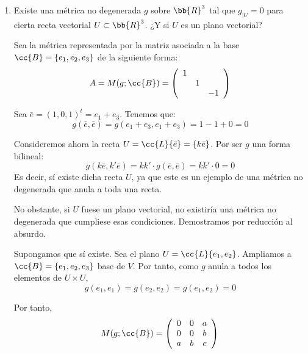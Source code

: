 \begin{ejercicio}
\begin{enumerate}
        \item Existe una métrica no degenerada $g$ sobre $\bb{R}^3$ tal que $g_{\left|U\right.}=0$ para cierta recta vectorial $U\subset \bb{R}^3$. ¿Y si $U$ es un plano vectorial?
        
        Sea la métrica representada por la matriz asociada a la base $\cc{B}=\{e_1,e_2,e_3\}$ de la siguiente forma:
        \begin{equation*}
            A=M(g;\cc{B}) = \left( \begin{array}{ccc}
                1 & \\
                 & 1 \\
                 & & -1 \\
            \end{array} \right)
        \end{equation*}

        Sea $\bar{e}=(1,0,1)^t = e_1+e_3$. Tenemos que:
        \begin{equation*}
            g(\bar{e},\bar{e}) = g(e_1+e_3, e_1+e_3) = 1-1+0 = 0
        \end{equation*}

        Consideremos ahora la recta $U=\cc{L}\{\bar{e}\} = \{k\bar{e}\}$. Por ser $g$ una forma bilineal:
        \begin{equation*}
            g(k\bar{e},k'\bar{e}) = kk'\cdot g(\bar{e},\bar{e})=kk' \cdot 0 = 0
        \end{equation*}
        Es decir, sí existe dicha recta $U$, ya que este es un ejemplo de una métrica no degenerada que anula a toda una recta.

        No obstante, si $U$ fuese un plano vectorial, no existiría una métrica no degenerada que cumpliese esas condiciones. Demostramos por reducción al absurdo.

        Supongamos que sí existe. Sea el plano $U=\cc{L}\{e_1, e_2\}$. Ampliamos a $\cc{B}=\{e_1, e_2, e_3\}$ base de $V$. Por tanto, como $g$ anula a todos los elementos de $U\times U$,
        \begin{equation*}
            g(e_1,e_1) = g(e_2,e_2) = g(e_1,e_2) = 0
        \end{equation*}
        
        Por tanto,
        \begin{equation*}
            M(g;\cc{B})= \left(\begin{array}{ccc}
                0 & 0 & a \\
                0 & 0 & b \\
                a & b & c
            \end{array}\right)
        \end{equation*}


\end{enumerate}
\end{ejercicio}
